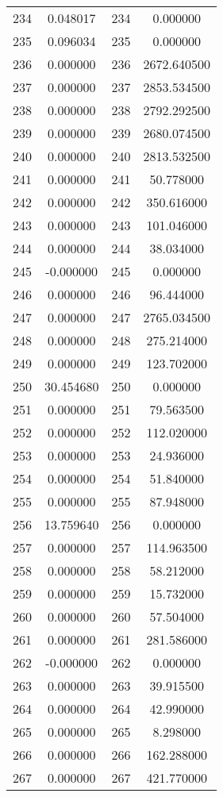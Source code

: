 \documentclass[12pt]{article}
\begin{document}
\begin{longtable}{@{}cccc@{}}
234 & 0.048017 & 234 & 0.000000 \\
235 & 0.096034 & 235 & 0.000000 \\
236 & 0.000000 & 236 & 2672.640500 \\
237 & 0.000000 & 237 & 2853.534500 \\
238 & 0.000000 & 238 & 2792.292500 \\
239 & 0.000000 & 239 & 2680.074500 \\
240 & 0.000000 & 240 & 2813.532500 \\
241 & 0.000000 & 241 & 50.778000 \\
242 & 0.000000 & 242 & 350.616000 \\
243 & 0.000000 & 243 & 101.046000 \\
244 & 0.000000 & 244 & 38.034000 \\
245 & -0.000000 & 245 & 0.000000 \\
246 & 0.000000 & 246 & 96.444000 \\
247 & 0.000000 & 247 & 2765.034500 \\
248 & 0.000000 & 248 & 275.214000 \\
249 & 0.000000 & 249 & 123.702000 \\
250 & 30.454680 & 250 & 0.000000 \\
251 & 0.000000 & 251 & 79.563500 \\
252 & 0.000000 & 252 & 112.020000 \\
253 & 0.000000 & 253 & 24.936000 \\
254 & 0.000000 & 254 & 51.840000 \\
255 & 0.000000 & 255 & 87.948000 \\
256 & 13.759640 & 256 & 0.000000 \\
257 & 0.000000 & 257 & 114.963500 \\
258 & 0.000000 & 258 & 58.212000 \\
259 & 0.000000 & 259 & 15.732000 \\
260 & 0.000000 & 260 & 57.504000 \\
261 & 0.000000 & 261 & 281.586000 \\
262 & -0.000000 & 262 & 0.000000 \\
263 & 0.000000 & 263 & 39.915500 \\
264 & 0.000000 & 264 & 42.990000 \\
265 & 0.000000 & 265 & 8.298000 \\
266 & 0.000000 & 266 & 162.288000 \\
267 & 0.000000 & 267 & 421.770000 \\

\end{longtable}
\end{document}
